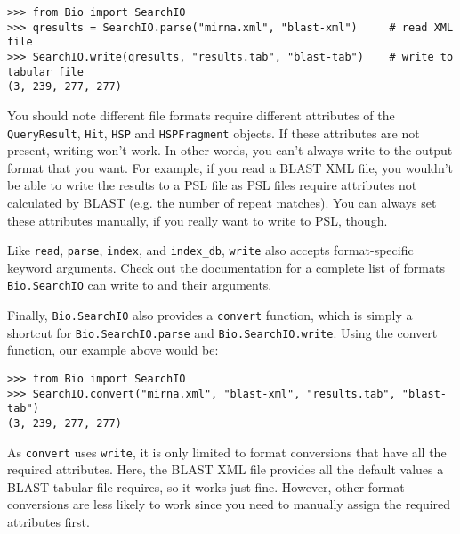 \begin{verbatim}
>>> from Bio import SearchIO
>>> qresults = SearchIO.parse("mirna.xml", "blast-xml")     # read XML file
>>> SearchIO.write(qresults, "results.tab", "blast-tab")    # write to tabular file
(3, 239, 277, 277)
\end{verbatim}

You should note different file formats require different attributes of the
\verb|QueryResult|, \verb|Hit|, \verb|HSP| and \verb|HSPFragment| objects. If
these attributes are not present, writing won't work. In other words, you can't
always write to the output format that you want. For example, if you read a
BLAST XML file, you wouldn't be able to write the results to a PSL file as PSL
files require attributes not calculated by BLAST (e.g. the number of repeat
matches). You can always set these attributes manually, if you really want to
write to PSL, though.

Like \verb|read|, \verb|parse|, \verb|index|, and \verb|index_db|, \verb|write|
also accepts format-specific keyword arguments. Check out the documentation for
a complete list of formats \verb|Bio.SearchIO| can write to and their arguments.

Finally, \verb|Bio.SearchIO| also provides a \verb|convert| function, which is
simply a shortcut for \verb|Bio.SearchIO.parse| and \verb|Bio.SearchIO.write|.
Using the convert function, our example above would be:

\begin{verbatim}
>>> from Bio import SearchIO
>>> SearchIO.convert("mirna.xml", "blast-xml", "results.tab", "blast-tab")
(3, 239, 277, 277)
\end{verbatim}

As \verb|convert| uses \verb|write|, it is only limited to format conversions
that have all the required attributes. Here, the BLAST XML file provides all the
default values a BLAST tabular file requires, so it works just fine. However,
other format conversions are less likely to work since you need to manually
assign the required attributes first.

